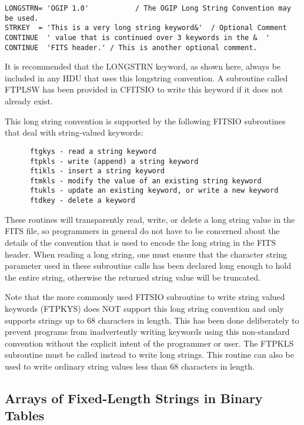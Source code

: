 \documentclass[11pt]{book}
\begin{document}
\begin{verbatim}
LONGSTRN= 'OGIP 1.0'           / The OGIP Long String Convention may be used.
STRKEY  = 'This is a very long string keyword&'  / Optional Comment
CONTINUE  ' value that is continued over 3 keywords in the &  '
CONTINUE  'FITS header.' / This is another optional comment.
\end{verbatim}
It is recommended that the LONGSTRN keyword, as shown
here, always be included in any HDU that uses this longstring
convention.  A subroutine called FTPLSW
has been provided in CFITSIO to write this keyword if it does not
already exist.

This long string convention is supported by the following FITSIO
subroutines that deal with string-valued keywords:

\begin{verbatim}
      ftgkys - read a string keyword
      ftpkls - write (append) a string keyword
      ftikls - insert a string keyword
      ftmkls - modify the value of an existing string keyword
      ftukls - update an existing keyword, or write a new keyword
      ftdkey - delete a keyword
\end{verbatim}
These routines will transparently read, write, or delete a long string
value in the FITS file, so programmers in general do not have to be
concerned about the details of the convention that is used to encode
the long string in the FITS header.  When reading a long string, one
must ensure that the character string parameter used in these
subroutine calls has been declared long enough to hold the entire
string, otherwise the returned string value will be truncated.

Note that the more commonly used FITSIO subroutine to write string
valued keywords (FTPKYS) does NOT support this long string convention
and only supports strings up to 68 characters in length.  This has been
done deliberately to prevent programs from inadvertently writing
keywords using this non-standard convention without the explicit intent
of the programmer or user.   The FTPKLS subroutine must be called
instead to write long strings.  This routine can also be used to write
ordinary string values less than 68 characters in length.


\subsection{Arrays of Fixed-Length Strings in Binary Tables}
\end{document}
